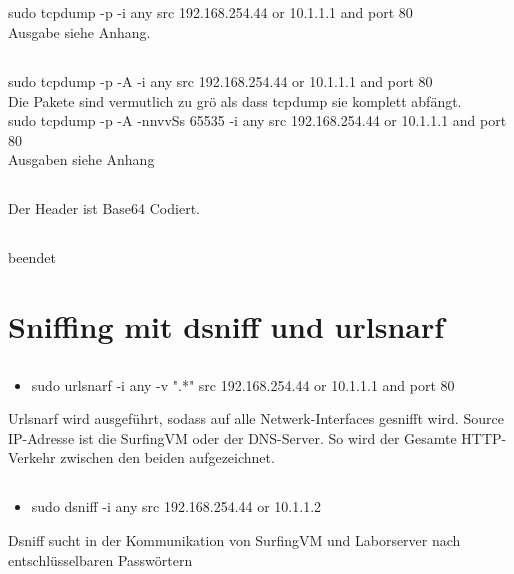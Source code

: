 \documentclass[12pt]{article}
\theoremstyle{plain}
\begin{document}
\subsection{}
sudo tcpdump -p -i any src 192.168.254.44 or 10.1.1.1 and port 80\\
Ausgabe siehe Anhang.
\subsection{}
sudo tcpdump -p -A -i any src 192.168.254.44 or 10.1.1.1 and port 80\\
Die Pakete sind vermutlich zu grö als dass tcpdump sie komplett abfängt.\\
sudo tcpdump -p -A -nnvvSs 65535 -i any src 192.168.254.44 or 10.1.1.1 and port 80\\
Ausgaben siehe Anhang
\subsection{}
Der Header ist Base64 Codiert. 
\subsection{}
beendet
\section{Sniffing mit dsniff und urlsnarf}
\subsection{}
\begin{itemize}
\item sudo urlsnarf -i any -v ".*" src 192.168.254.44 or 10.1.1.1 and port 80
\end{itemize}
Urlsnarf wird ausgeführt, sodass auf alle Netwerk-Interfaces gesnifft wird. Source IP-Adresse ist die SurfingVM oder der DNS-Server. So wird der Gesamte HTTP-Verkehr zwischen den beiden aufgezeichnet.
\subsection{}
\begin{itemize}
\item sudo dsniff -i any src 192.168.254.44 or 10.1.1.2
\end{itemize}
Dsniff sucht in der Kommunikation von SurfingVM und Laborserver nach entschlüsselbaren Passwörtern
\end{document}
